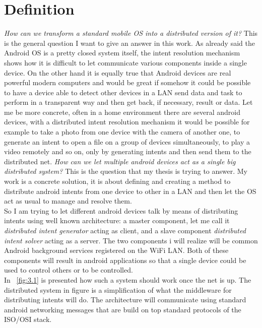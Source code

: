 \section{Definition} \label{problemdefinition}
\textit{How can we transform a standard mobile OS into a distributed version of it?} This is the general question I want to give an answer in this work.
As already said the Android OS is a pretty closed system itself, the intent resolution mechanism shows how it is difficult to let communicate various components inside a single device. On the other hand it is equally true that Android devices are real powerful modern computers and would be great if somehow it could be possible to have a device able to detect other devices in a LAN send data and task to perform in a transparent way and then get back, if necessary, result or data. Let me be more concrete, often in a home environment there are several android devices, with a distributed intent resolution mechanism it would be possible for example to take a photo from one device with the camera of another one, to generate an intent to open a file on a group of devices simultaneously, to play a video remotely and so on, only by generating intents and then send them to the distributed net. \textit{How can we let multiple android devices act as a single big distributed system?} This is the question that my thesis is trying to answer. My work is a concrete solution, it is about defining and creating a method to distribute android intents from one device to other in a LAN and then let the OS act as usual to manage and resolve them.\\
So I am trying to let different android devices talk by means of distributing intents using  well known architecture: a master component, let me call it \textit{distributed intent generator} acting as client, and a slave component \textit{distributed intent solver} acting as a server. The two components i will realize will be common Android background services registered on the WiFi LAN. Both of these components will result in android applications so that a single device could be used to control others or to be controlled.\\
In \figurename~\ref{fig:3.1} is presented how such a system should work once the net is up. The distributed system in figure is a simplification of what the middleware for distributing intents will do. The architecture will communicate using standard android networking messages that are build on top standard protocols of the ISO/OSI stack.
 
